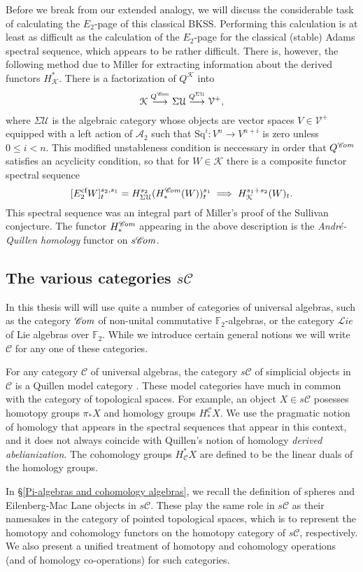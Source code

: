 \documentclass[11pt]{amsart} \renewcommand{\baselinestretch}{1.2}
\theoremstyle{plain}
\numberwithin{equation}{section} %
\theoremstyle{plain}
\numberwithin{equation}{chapter} %
\renewcommand{\to}{\longrightarrow}
\newcommand{\scrL}{\mathscr{L}}
\newcommand{\scrC}{\mathscr{C}}
\newcommand{\calV}{\mathcal{V}}
\newcommand{\calu}{\mathcal{U}}
\newcommand{\cala}{\mathcal{A}}
\newcommand{\calk}{\mathcal{K}}
\newcommand{\calc}{\mathcal{C}}
\newcommand{\vect}[2]{\calV^{#1}_{#2}}
\newcommand{\Sq}{\mathrm{Sq}}
\newcommand{\F}{\mathbb{F}}
\newcommand{\algs}{{\scrC\!\textit{\normalfont\textit{om}}}}
\newcommand{\liealgs}{{\scrL\!\textit{ie}}}
\newcommand{\Ftwo}{\F_2}
\newcommand{\E}[5]{[E^{#1}_{#2}#3]^{#4}_{#5}}
\newcommand{\BKSS}{BKSS}
\newcommand{\SubsectionOrSection}[1]{\subsection{#1}}
\begin{document}
\begin{Introduction}
Before we break from our extended analogy, we will discuss the considerable task of calculating the $E_2$-page of this classical \BKSS. Performing this calculation is at least as difficult as the calculation of the $E_2$-page for the classical (stable) Adams spectral sequence, which appears to be rather difficult. There is, however, the following method due to Miller \cite{MillerSullivanConjecture.pdf} for extracting information about the derived functors $H^*_{\calk}$. There is a factorization of $Q^{\calk}$ into 
\[\calk\overset{Q^{\algs}}{\to} \Sigma\calu \overset{Q^{\Sigma\calu}}{\to}\vect{+}{},\]
where $\Sigma\calu$ is the algebraic category whose objects are vector spaces $V\in\vect{+}{}$ equipped with a left action of $\cala_2$ such that $\Sq^i:V^n\to V^{n+i}$ is zero unless $0\leq i <n$.
This modified unstableness condition is neccessary in order that $Q^\algs$ satisfies an acyclicity condition, so that for $W\in\calk$ there is a composite functor spectral sequence
\[\E{\textup{cf}}{2}{W}{s_2,s_1}{t}=H^{s_2}_{\Sigma\calu}(H_*^{\algs}(W))^{s_1}_t\implies H^{s_1+s_2}_\calk (W)_t.\]
This spectral sequence was an integral part of Miller's proof of the Sullivan conjecture. The functor $H_*^{\algs}$ appearing in the above description is the \emph{Andr\'e-Quillen  homology} functor on $s\algs$. 

\SubsectionOrSection{The various categories $s\calc$}
In this thesis will will use quite a number of categories of universal algebras, such as the category $\algs$ of non-unital commutative $\Ftwo$-algebras, or the category $\liealgs$ of Lie algebras over $\Ftwo$. While we introduce certain general notions we will write $\calc$ for any one of these categories.

For any category $\calc $ of universal algebras, the category $s\calc$ of simplicial objects in $\calc$ is a Quillen model category \cite{QuillenHomAlg.pdf}. These model categories have much in common with the category of topological spaces. For example, an  object $X\in s\calc$ posesses homotopy groups $\pi_*X$ and homology groups $H_*^{\calc}X$. We use the  pragmatic notion of homology that appears in the spectral sequences that appear in this context, and it does not always coincide with Quillen's notion of homology \emph{derived abelianization}. The cohomology groups $H^*_{\calc}X$ are defined to be the linear duals of the homology groups.

In \S\ref{Pi-algebras and cohomology algebras}, we recall the  definition of  spheres and Eilenberg-Mac Lane objects in $s\calc$. These play the same role in $s\calc$ as their namesakes in the category of pointed topological spaces, which is to represent the homotopy and cohomology functors on the homotopy category of $s\calc$, respectively.
We also present a unified treatment of homotopy and cohomology operations (and of homology co-operations) for such categories. 


\end{Introduction}
\end{document}
